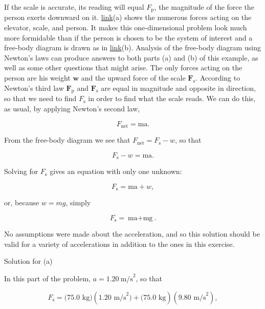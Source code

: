 \documentclass[
]{book}
\newenvironment{tinysection}{}{}
\begin{document}
If the scale is accurate, its reading will equal \(F_{\text{p}}{}\), the
magnitude of the force the person exerts downward on it.
\protect\hyperlink{import-auto-id347645}{link}(a) shows the
numerous forces acting on the elevator, scale, and person. It makes this
one-dimensional problem look much more formidable than if the person is
chosen to be the system of interest and a free-body diagram is drawn as
in \protect\hyperlink{import-auto-id347645}{link}(b). Analysis of
the free-body diagram using Newton's laws can produce answers to both
parts (a) and (b) of this example, as well as some other questions that
might arise. The only forces acting on the person are his weight
\(\textbf{w}{}\) and the upward force of the scale
\(\textbf{F}_{\text{s}}{}\). According to Newton's third law
\(\textbf{F}_{\text{p}}{}\) and \(\textbf{F}_{\text{s}}{}\) are equal in
magnitude and opposite in direction, so that we need to find
\(F_{\text{s}}{}\) in order to find what the scale reads. We can do this,
as usual, by applying Newton's second law,

\leavevmode\hypertarget{eip-id2548908}{}%
\[{F_{\text{net}} = \text{ma}}.\]

From the free-body diagram we see that
\({F_{\text{net}} = {F_{\text{s}} - w}}{}\), so that

\leavevmode\hypertarget{eip-id2522872}{}%
\[{{F_{\text{s}} - w} = \text{ma}}.\]

Solving for \(F_{\text{s}}{}\) gives an equation with only one unknown:

\leavevmode\hypertarget{eip-id1957748}{}%
\[{F_{\text{s}} = {\text{ma} + w}},\]

or, because \(w = {mg}\), simply

\leavevmode\hypertarget{eip-id3507099}{}%
\[{F_{\text{s}} = {\text{ma} + \text{mg}}}.\]

No assumptions were made about the acceleration, and so this solution
should be valid for a variety of accelerations in addition to the ones
in this exercise.

\begin{tinysection}

{Solution for (a)}

\end{tinysection}

In this part of the problem, \({a = 1.20\ \text{m/s}^{2}}{}\), so that

\leavevmode\hypertarget{eip-id1966528}{}%
\[{{F_{\text{s}} = (}\text{75}\text{.}\text{0\ kg})(1\text{.}\text{20\ m/s}^{2}{) + (}\text{75}\text{.}\text{0\ kg})(9\text{.}\text{80\ m/s}^{2})},\]
\end{document}
